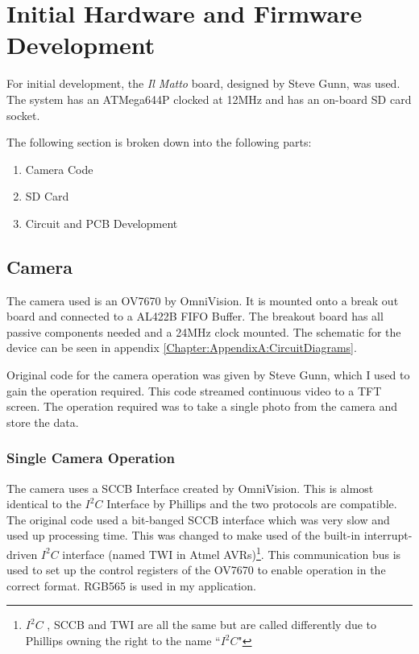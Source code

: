 \chapter{Initial Hardware and Firmware Development} \label{Chapter:HardwareDevelopment}
For initial development, the \textit{Il Matto} board, designed by Steve Gunn, was used. The system has an ATMega644P clocked at 12MHz and has an on-board SD card socket. 

The following section is broken down into the following parts:
\begin{enumerate}
\item Camera Code
\item SD Card
\item Circuit and PCB Development
\end{enumerate}

\section{Camera} \label{Section:Camera}

The camera used is an OV7670 by OmniVision. It is mounted onto a break out board and connected to a AL422B FIFO Buffer. The breakout board has all passive components needed and a 24MHz clock mounted. The schematic for the device can be seen in appendix \ref{Chapter:AppendixA:CircuitDiagrams}.

Original code for the camera operation was given by Steve Gunn, which I used to gain the operation required. This code streamed continuous video to a TFT screen. The operation required was to take a single photo from the camera and store the data. 

\subsection{Single Camera Operation}

The camera uses a SCCB Interface \citep{SCCB_Interface} created by OmniVision. This is almost identical to the $I^{2}C$ Interface by Phillips and the two protocols are compatible. The original code used a bit-banged SCCB interface which was very slow and used up processing time. This was changed to make used of the built-in interrupt-driven $I^{2}C$ interface (named TWI in Atmel AVRs)\footnote{$I^{2}C$ , SCCB and TWI are all the same but are called differently due to Phillips owning the right to the name ``$I^{2}C$"}. This communication bus is used to set up the control registers of the OV7670 to enable operation in the correct format. RGB565 is used in my application.


